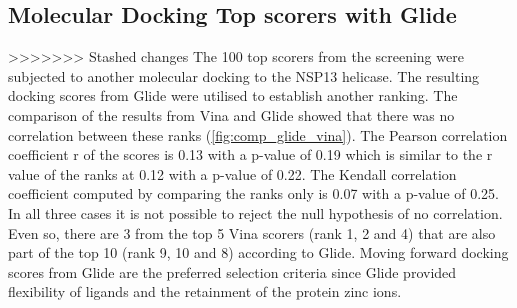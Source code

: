 \documentclass[11pt, letterpaper, titlepage]{article}
\begin{document}
\subsection{Molecular Docking Top scorers with Glide}
>>>>>>> Stashed changes
The 100 top scorers from the screening were subjected to another molecular docking to the NSP13 helicase. The resulting docking scores from Glide were utilised to establish another ranking. The comparison of the results from Vina and Glide showed that there was no correlation between these ranks (\autoref{fig:comp_glide_vina}). The Pearson correlation coefficient r of the scores is 0.13 with a p-value of 0.19 which is similar to the r value of the ranks at 0.12 with a p-value of 0.22. The Kendall correlation coefficient computed by comparing the ranks only is 0.07 with a p-value of 0.25. In all three cases it is not possible to reject the null hypothesis of no correlation. Even so, there are 3 from the top 5 Vina scorers (rank 1, 2 and 4) that are also part of the top 10 (rank 9, 10 and 8) according to Glide. Moving forward docking scores from Glide are the preferred selection criteria since Glide provided flexibility of ligands and the retainment of the protein zinc ions. \\
\end{document}
